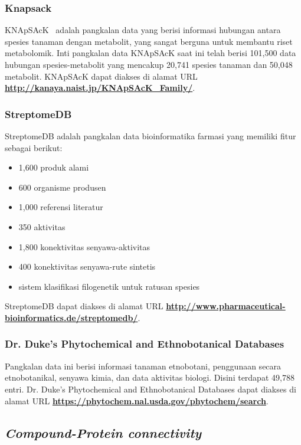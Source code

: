 		\subsubsection{Knapsack} \label{knapsack}
		KNApSAcK~\cite{pmid23292603,} adalah pangkalan data yang berisi informasi hubungan antara spesies tanaman dengan metabolit, yang sangat berguna untuk membantu riset metabolomik. Inti pangkalan data KNApSAcK saat ini telah berisi 101,500 data hubungan spesies-metabolit yang mencakup 20,741 spesies tanaman dan 50,048 metabolit. KNApSAcK dapat diakses di alamat URL \textbf{\url{http://kanaya.naist.jp/KNApSAcK_Family/}}.

		\subsubsection{StreptomeDB} \label{streptome_db}
		StreptomeDB adalah pangkalan data bioinformatika farmasi yang memiliki fitur sebagai berikut:
		\begin{itemize}
		\item 1,600 produk alami
		\item 600 organisme produsen
		\item 1,000 referensi literatur
		\item 350 aktivitas
		\item 1,800 konektivitas senyawa-aktivitas
		\item 400 konektivitas senyawa-rute sintetis
		\item sistem klasifikasi filogenetik untuk ratusan spesies
		\end{itemize}
		StreptomeDB dapat diakses di alamat URL \textbf{\url{http://www.pharmaceutical-bioinformatics.de/streptomedb/}}.

		\subsubsection{Dr. Duke's Phytochemical and Ethnobotanical Databases} \label{pedb}
		Pangkalan data ini berisi informasi tanaman etnobotani, penggunaan secara etnobotanikal, senyawa kimia, dan data aktivitas biologi. Disini terdapat 49,788 entri. Dr. Duke's Phytochemical and Ethnobotanical Databases dapat diakses di alamat URL \textbf{\url{https://phytochem.nal.usda.gov/phytochem/search}}.

	\subsection{\emph{Compound-Protein connectivity}}

